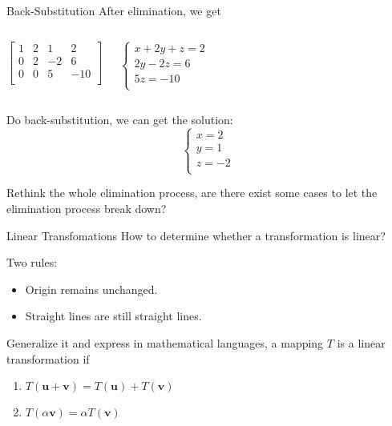 \documentclass{beamer}
\begin{document}
\begin{frame}{Back-Substitution}
After elimination, we get
\begin{columns}
    \begin{equation*}
        \left[ \begin{matrix}
            1&		2&		1&		2\\
            0&		2&		-2&		6\\
            0&		0&		5&		-10\\
        \end{matrix} \right]
    \end{equation*}

    \begin{equation*}
        \begin{cases}
            x+2y+z=2\\
            2y-2z=6\\
            5z=-10\\
        \end{cases}
    \end{equation*}
\end{columns}
Do back-substitution, we can get the solution:
\begin{equation*}
    \begin{cases}
        x=2\\
        y=1\\
        z=-2\\
    \end{cases}
\end{equation*}

Rethink the whole elimination process, are there exist some cases to let the elimination process break down?
\end{frame}









\begin{frame}{Linear Transfomations}
How to determine whether a transformation is linear?

\vspace{5pt}
Two rules:
\begin{itemize}
    \item Origin remains unchanged.
    \item Straight lines are still straight lines.
\end{itemize}

Generalize it and express in mathematical languages, a mapping $T$ is a linear transformation if
\begin{enumerate}
    \item $T\left( \mathbf{u}+\mathbf{v} \right) =T\left( \mathbf{u} \right) +T\left( \mathbf{v} \right)$
    \item $T\left( \alpha \mathbf{v} \right) =\alpha T\left( \mathbf{v} \right) $
\end{enumerate}
\end{frame}
\end{document}
